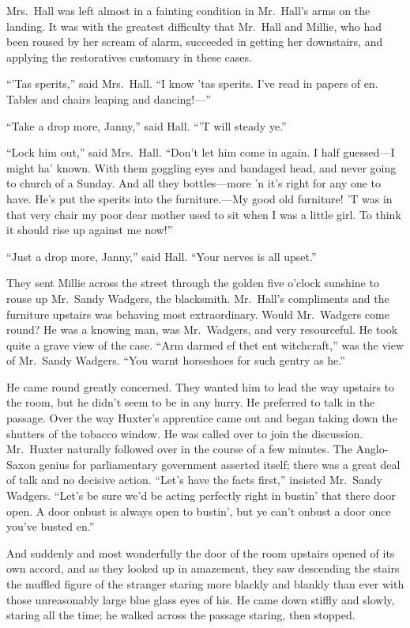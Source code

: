Mrs.\ Hall was left almost in a fainting condition in Mr.\ Hall’s arms on the landing. It was with the greatest difficulty that Mr.\ Hall and Millie, who had been roused by her scream of alarm, succeeded in getting her downstairs, and applying the restoratives customary in these cases.

“\kern1pt’Tas sperits,” said Mrs.\ Hall. “I know ’tas sperits. I’ve read in papers of en. Tables and chairs leaping and dancing!—”

“Take a drop more, Janny,” said Hall. “\kern1pt’T will steady ye.”

“Lock him out,” said Mrs.\ Hall. “Don’t let him come in again. I half guessed—I might ha’ known. With them goggling eyes and bandaged head, and never going to church of a Sunday. And all they bottles—more ’n it’s right for any one to have. He’s put the sperits into the furniture.—My good old furniture! ’T was in that very chair my poor dear mother used to sit when I was a little girl. To think it should rise up against me now!”

“Just a drop more, Janny,” said Hall. “Your nerves is all upset.”

They sent Millie across the street through the golden five o’clock sunshine to rouse up Mr.\ Sandy Wadgers, the blacksmith. Mr.\ Hall’s compliments and the furniture upstairs was behaving most extraordinary. Would Mr.\ Wadgers come round? He was a knowing man, was Mr.\ Wadgers, and very resourceful. He took quite a grave view of the case. “Arm darmed ef thet ent witchcraft,” was the view of Mr.\ Sandy Wadgers. “You warnt horseshoes for such gentry as he.”

He came round greatly concerned. They wanted him to lead the way upstairs to the room, but he didn’t seem to be in any hurry. He preferred to talk in the passage. Over the way Huxter’s apprentice came out and began taking down the shutters of the tobacco window. He was called over to join the discussion. Mr.\ Huxter naturally followed over in the course of a few minutes. The Anglo-Saxon genius for parliamentary government asserted itself; there was a great deal of talk and no decisive action. “Let’s have the facts first,” insisted Mr.\ Sandy Wadgers. “Let’s be sure we’d be acting perfectly right in bustin’ that there door open. A door onbust is always open to bustin’, but ye can’t onbust a door once you’ve busted en.”

And suddenly and most wonderfully the door of the room upstairs opened of its own accord, and as they looked up in amazement, they saw descending the stairs the muffled figure of the stranger staring more blackly and blankly than ever with those unreasonably large blue glass eyes of his. He came down stiffly and slowly, staring all the time; he walked across the passage staring, then stopped.

